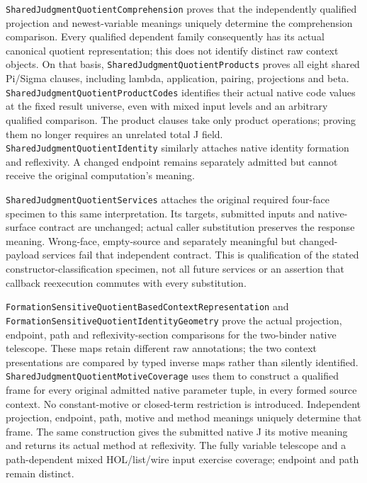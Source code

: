 \documentclass[11pt]{article}
\theoremstyle{definition}
\theoremstyle{remark}
\begin{document}
\nolinkurl{SharedJudgmentQuotientComprehension} proves that the independently
qualified projection and newest-variable meanings uniquely determine the
comprehension comparison. Every qualified dependent family consequently has
its actual canonical quotient representation; this does not identify distinct
raw context objects. On that basis,
\nolinkurl{SharedJudgmentQuotientProducts} proves all eight shared Pi/Sigma
clauses, including lambda, application, pairing, projections and beta.
\nolinkurl{SharedJudgmentQuotientProductCodes} identifies their actual native
code values at the fixed result universe, even with mixed input levels and
an arbitrary qualified comparison. The product clauses take only product
operations; proving them no longer requires an unrelated total J field.
\nolinkurl{SharedJudgmentQuotientIdentity} similarly attaches native identity
formation and reflexivity. A changed endpoint remains separately admitted
but cannot receive the original computation's meaning.

\nolinkurl{SharedJudgmentQuotientServices} attaches the original required
four-face specimen to this same interpretation. Its targets, submitted inputs
and native-surface contract are unchanged; actual caller substitution preserves
the response meaning. Wrong-face, empty-source and separately meaningful but
changed-payload services fail that independent contract. This is qualification
of the stated constructor-classification specimen, not all future services or
an assertion that callback reexecution commutes with every substitution.

\nolinkurl{FormationSensitiveQuotientBasedContextRepresentation} and
\nolinkurl{FormationSensitiveQuotientIdentityGeometry} prove the actual
projection, endpoint, path and reflexivity-section comparisons for the
two-binder native telescope. These maps retain different raw annotations;
the two context presentations are compared by typed inverse maps rather
than silently identified.
\nolinkurl{SharedJudgmentQuotientMotiveCoverage} uses them to construct a
qualified frame for every original admitted native parameter tuple, in
every formed source context. No constant-motive or closed-term restriction
is introduced. Independent projection, endpoint, path, motive and method
meanings uniquely determine that frame. The same construction gives the
submitted native J its motive meaning and returns its actual method at
reflexivity. The fully variable telescope and a path-dependent mixed
HOL/list/wire input exercise coverage; endpoint and path remain distinct.
\end{document}
